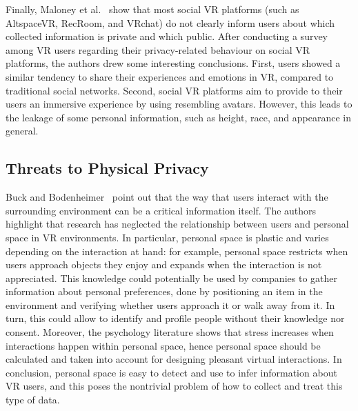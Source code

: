 \documentclass[journal]{IEEEtran}
\begin{document}
Finally, Maloney et al.~\cite{maloney2020} show that most social VR platforms (such as AltspaceVR, RecRoom, and VRchat) do not clearly inform users about which collected information is private and which public. After conducting a survey among VR users regarding their privacy-related behaviour on social VR platforms, the authors drew some interesting conclusions. First, users showed a similar tendency to share their experiences and emotions in VR, compared to traditional social networks. Second, social VR platforms aim to provide to their users an immersive experience by using resembling avatars. However, this leads to the leakage of some personal information, such as height, race, and appearance in general.



\subsection{Threats to Physical Privacy}
Buck and Bodenheimer~\cite{buck2021} point out that the way that users interact with the surrounding environment can be a critical information itself. The authors highlight that research has neglected the relationship between users and personal space in VR environments. In particular, personal space is plastic and varies depending on the interaction at hand: for example, personal space restricts when users approach objects they enjoy and expands when the interaction is not appreciated. This knowledge could potentially be used by companies to gather information about personal preferences, done by positioning an item in the environment and verifying whether users approach it or walk away from it. In turn, this could allow to identify and profile people without their knowledge nor consent. Moreover, the psychology literature shows that stress increases when interactions happen within personal space, hence personal space should be calculated and taken into account for designing pleasant virtual interactions. In conclusion, personal space is easy to detect and use to infer information about VR users, and this poses the nontrivial problem of how to collect and treat this type of data.
\end{document}
